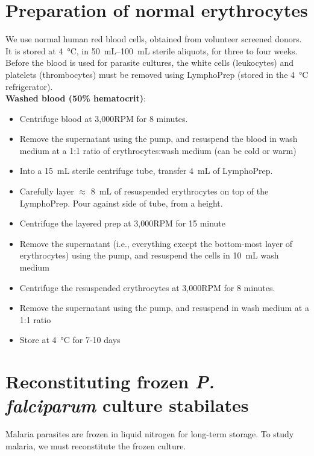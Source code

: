 \documentclass{article}
\begin{document}
\newpage
\section{Preparation of normal erythrocytes}

We use normal human red blood cells, obtained from volunteer screened donors. It is stored at \SI{4}{\celsius}, in \SIrange{50}{100}{mL} sterile aliquots, for three to four weeks.\\

Before the blood is used for parasite cultures, the white cells (leukocytes) and platelets (thrombocytes) must be removed using LymphoPrep (stored in the \SI{4}{\celsius} refrigerator).\\

\textbf{Washed blood (50\% hematocrit)}:

\begin{itemize}
	\item Centrifuge blood at 3,000RPM for 8 minutes.
	\item Remove the supernatant using the pump, and resuspend the blood in wash medium at a 1:1 ratio of erythrocytes:wash medium (can be cold or warm)
	\item Into a \SI{15}{mL} sterile centrifuge tube, transfer \SI{4}{mL} of LymphoPrep.
	\item Carefully layer $\approx$ \SI{8}{mL} of resuspended erythrocytes on top of the LymphoPrep. Pour against side of tube, from a height.
	\item Centrifuge the layered prep at 3,000RPM for 15 minute
	\item Remove the supernatant (i.e., everything except the bottom-most layer of erythrocytes) using the pump, and resuspend the cells in \SI{10}{mL} wash medium
	\item Centrifuge the resuspended erythrocytes at 3,000RPM for 8 minutes.
	\item Remove the supernatant using the pump, and resuspend in wash medium at a 1:1 ratio
	\item Store at \SI{4}{\celsius} for 7-10 days
\end{itemize}

\newpage
\section{Reconstituting frozen \emph{P. falciparum} culture stabilates}

Malaria parasites are frozen in liquid nitrogen for long-term storage. To study malaria, we must reconstitute the frozen culture.\\
\end{document}
